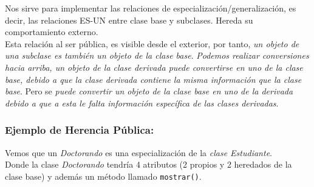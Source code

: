 Nos sirve para implementar las relaciones de especialización/generalización, es decir, las relaciones ES-UN entre clase base y subclases.
Hereda su comportamiento externo.\\

Esta relación al ser pública, es visible desde el exterior, por tanto, \textit{un objeto de una subclase es también un objeto de la clase base}.
\textit{Podemos realizar conversiones hacia arriba, un objeto de la clase derivada puede convertirse en uno de la clase base, debido a que la clase derivada contiene la misma información que la clase base}.
Pero  se \textit{puede convertir un objeto de la clase base en uno de la derivada debido a que a esta le falta información específica de las clases derivadas}.

\subsubsection{Ejemplo de Herencia Pública:}
Vemos que un \textit{Doctorando} es una especialización de la \textit{clase Estudiante}.\\
Donde la clase \textit{Doctorando} tendría 4 atributos (2 propios y 2 heredados de la clase base) y además un método llamado \texttt{mostrar()}.

